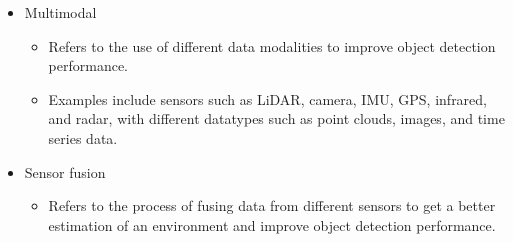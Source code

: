 \documentclass[rnd]{mas_proposal}
\begin{document}
\begin{itemize}
\begin{itemize}
\begin{itemize}
                \end{itemize}
            \item Multimodal
                \begin{itemize}
                    \item Refers to the use of different data modalities to improve object detection performance.
                    \item Examples include sensors such as LiDAR, camera, IMU, GPS, infrared, and radar, with different datatypes such as point clouds, images, and time series data.
                \end{itemize}
            \item Sensor fusion
                \begin{itemize}
                    \item Refers to the process of fusing data from different sensors to get a better estimation of an environment and improve object detection performance.
                \end{itemize}
        \end{itemize}

        
        
        

\end{itemize}
\end{document}
